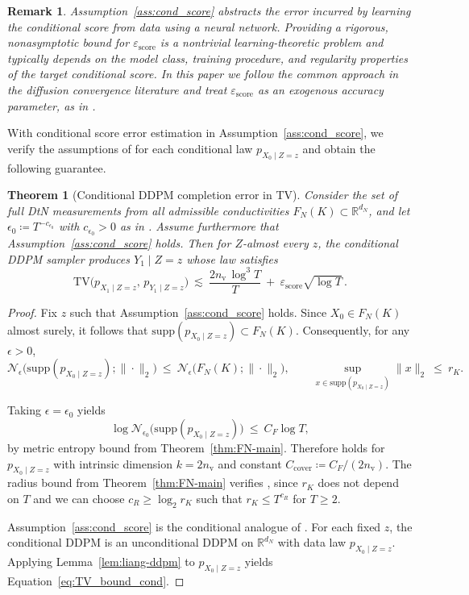 \documentclass{article}
\def\Eqref#1{Equation~\ref{#1}}
\newcommand{\R}{\mathbb{R}}
\newtheorem{theorem}{Theorem}[section]
\newtheorem{remark}{Remark}[section]
\begin{document}
\begin{remark}\label{rem:score-assump}
Assumption~\ref{ass:cond_score} abstracts the error incurred by learning the conditional score from data
using a neural network. Providing a rigorous, nonasymptotic bound for $\varepsilon_{\mathrm{score}}$ is a
nontrivial learning-theoretic problem and typically depends on the model class, training procedure, and
regularity properties of the target conditional score.
In this paper we follow the common approach in the diffusion convergence literature and treat
$\varepsilon_{\mathrm{score}}$ as an exogenous accuracy parameter, as in
\citep{chen2023improved,benton2023nearly,liang2025low}.
\end{remark}
With conditional score error estimation in Assumption~\ref{ass:cond_score}, we
verify the assumptions of \citet[Thm.~2]{liang2025low} for each conditional law $p_{X_0\mid Z=z}$ and obtain
the following guarantee.
\begin{theorem}[Conditional DDPM completion error in TV]\label{thm:cond-ddpm}
Consider the set of full DtN measurements from all admissible conductivities $F_N(K)\subset\R^{d_N}$, and let
$\epsilon_0\coloneqq T^{-c_{\epsilon_0}}$ with $c_{\epsilon_0}>0$ as in \citealp[Assumption~1]{liang2025low}. Assume furthermore that Assumption~\ref{ass:cond_score} holds. Then for $Z$-almost every $z$, the conditional DDPM sampler produces $Y_1 \mid Z=z$ whose law satisfies
\begin{equation}\label{eq:TV_bound_cond}
\mathrm{TV}\bigl(p_{X_1\mid Z=z},\,p_{Y_1\mid Z=z}\bigr)
\ \lesssim\ \frac{2n_{\mathrm v}\,\log^3 T}{T}\ +\ \varepsilon_{\mathrm{score}}\sqrt{\log T}\,.
\end{equation}
\end{theorem}

\begin{proof}
Fix $z$ such that Assumption~\ref{ass:cond_score} holds. Since $X_0\in F_N(K)$ almost surely, it follows
that $\mathrm{supp}(p_{X_0\mid Z=z})\subset F_N(K)$. Consequently, for any $\epsilon>0$,
\[
\mathcal{N}_\epsilon\bigl(\mathrm{supp}(p_{X_0\mid Z=z});\|\cdot\|_2\bigr)
\ \le\ \mathcal{N}_\epsilon\bigl(F_N(K);\|\cdot\|_2\bigr),
\qquad
\sup_{x\in\mathrm{supp}(p_{X_0\mid Z=z})}\|x\|_2\ \le\ r_K.
\]

Taking $\epsilon=\epsilon_0$ yields
\[
\log \mathcal{N}_{\epsilon_0}\bigl(\mathrm{supp}(p_{X_0\mid Z=z})\bigr)\ \le\ C_F\log T,
\]
by metric entropy bound from Theorem~\ref{thm:FN-main}.
Therefore \citealp[Assumption~1]{liang2025low} holds for $p_{X_0\mid Z=z}$ with intrinsic dimension
$k=2n_{\mathrm v}$ and constant $C_{\mathrm{cover}}\coloneqq C_F/(2n_{\mathrm v})$.
The radius bound from Theorem~\ref{thm:FN-main} verifies \citealp[Assumption~2]{liang2025low}, since $r_K$ does not depend on $T$ and we can choose $c_R\ge \log_2 r_K$ such that $r_K\le T^{c_R}$ for $T\ge 2$.

Assumption~\ref{ass:cond_score} is the conditional analogue of \citealp[Assumption~3]{liang2025low}.
For each fixed $z$, the conditional DDPM is an unconditional DDPM on $\R^{d_N}$ with data law
$p_{X_0\mid Z=z}$. Applying Lemma~\ref{lem:liang-ddpm} to $p_{X_0\mid Z=z}$ yields \Eqref{eq:TV_bound_cond}.
\end{proof}
\end{document}
